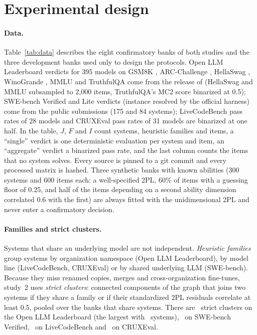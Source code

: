 \section{Experimental design}
\label{sec:design}

\paragraph{Data.} Table~\ref{tab:data} describes the eight confirmatory banks of both studies
and the three development banks used only to design the protocols. Open LLM Leaderboard
\citep{beeching2023openllm} verdicts for 395 models on GSM8K \citep{cobbe2021gsm8k},
ARC-Challenge \citep{clark2018arc}, HellaSwag \citep{zellers2019hellaswag}, WinoGrande
\citep{sakaguchi2020winogrande}, MMLU \citep{hendrycks2021mmlu} and TruthfulQA
\citep{lin2022truthfulqa} come from the release of \citet{polo2024tinybenchmarks}
(HellaSwag and MMLU subsampled to 2,000 items, TruthfulQA's MC2 score binarized at 0.5);
SWE-bench Verified and Lite \citep{jimenez2024swebench} verdicts (instance resolved by the
official harness) come from the public submissions (175 and 84 systems); LiveCodeBench
\citep{jain2025livecodebench} pass rates of 28 models and CRUXEval \citep{gu2024cruxeval}
pass rates of 31 models are binarized at one half. In the table, $J$, $F$ and $I$ count
systems, heuristic families and items, a ``single'' verdict is one deterministic evaluation
per system and item, an ``aggregate'' verdict a binarized pass rate, and the last column
counts the items that no system solves. Every source is pinned to a git commit and every
processed matrix is hashed. Three synthetic banks with known abilities (300 systems and 600
items each: a well-specified 2PL, 60\% of items with a guessing floor of 0.25, and half of
the items depending on a second ability dimension correlated 0.6 with the first) are always
fitted with the unidimensional 2PL and never enter a confirmatory decision.



\paragraph{Families and strict clusters.} Systems that share an underlying model are not
independent. \emph{Heuristic families} group systems by organization namespace (Open LLM
Leaderboard), by model line (LiveCodeBench, CRUXEval) or by shared underlying LLM
(SWE-bench). Because they miss renamed copies, merges and cross-organization fine-tunes,
study~2 uses \emph{strict clusters}: connected components of the graph that joins two systems
if they share a family or if their standardized 2PL residuals correlate at least 0.5, pooled
over the banks that share systems. There are \ClusOLLB\ strict clusters on the Open LLM
Leaderboard (the largest with \ClusOLLBMax\ systems), \ClusSWE\ on SWE-bench Verified,
\ClusLCB\ on LiveCodeBench and \ClusCRUX\ on CRUXEval.

